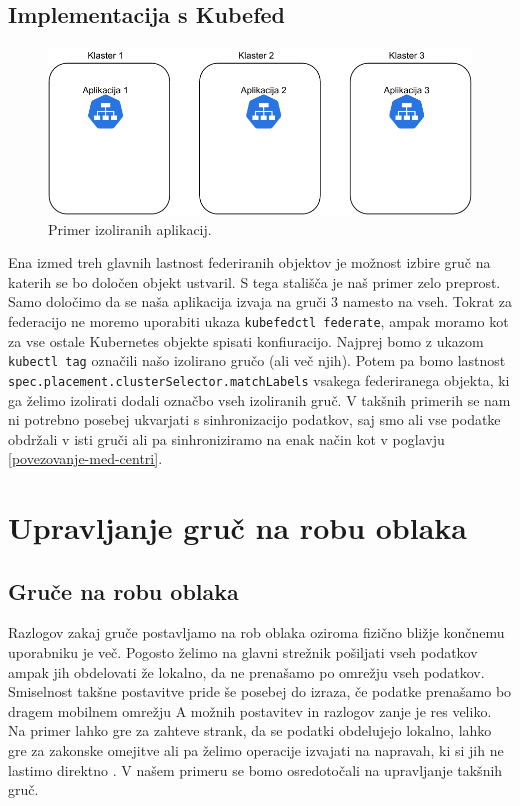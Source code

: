 \documentclass[a4paper, 12pt]{book}
\begin{document}
\section{Implementacija s Kubefed}
\begin{figure}[h]
\begin{center}
  \includegraphics[width=1.0\textwidth]{images/primer-izolirane-aplikacije.pdf}
\end{center}
\caption{Primer izoliranih aplikacij.}
\label{problem-prevelike-latence}
\end{figure}
Ena izmed treh glavnih lastnost federiranih objektov je možnost izbire gruč na katerih se bo določen objekt ustvaril. 
S tega stališča je naš primer zelo preprost.
Samo določimo da se naša aplikacija izvaja na gruči 3 namesto na vseh.
Tokrat za federacijo ne moremo uporabiti ukaza \verb|kubefedctl federate|, ampak moramo kot za vse ostale Kubernetes objekte spisati konfiuracijo.
Najprej bomo z ukazom \verb|kubectl tag| označili našo izolirano gručo (ali več njih).
Potem pa bomo lastnost \verb|spec.placement.clusterSelector.matchLabels| vsakega federiranega objekta, ki ga želimo izolirati dodali označbo vseh izoliranih gruč.
V takšnih primerih se nam ni potrebno posebej ukvarjati s sinhronizacijo podatkov, saj smo ali vse podatke obdržali v isti gruči ali pa sinhroniziramo na enak način kot v poglavju \ref{povezovanje-med-centri}.
\chapter{Upravljanje gruč na robu oblaka}
\label{edge-clusters}
\section{Gruče na robu oblaka}
Razlogov zakaj gruče postavljamo na rob oblaka oziroma fizično bližje končnemu uporabniku je več.
Pogosto želimo na glavni strežnik pošiljati vseh podatkov ampak jih obdelovati že lokalno, da ne prenašamo po omrežju vseh podatkov.
Smiselnost takšne postavitve pride še posebej do izraza, če podatke prenašamo bo dragem mobilnem omrežju
A možnih postavitev in razlogov zanje je res veliko.
Na primer lahko gre za zahteve strank, da se podatki obdelujejo lokalno, lahko gre za zakonske omejitve ali pa želimo operacije izvajati na napravah, ki si jih ne lastimo direktno .
V našem primeru se bomo osredotočali na upravljanje takšnih gruč.
\end{document}
